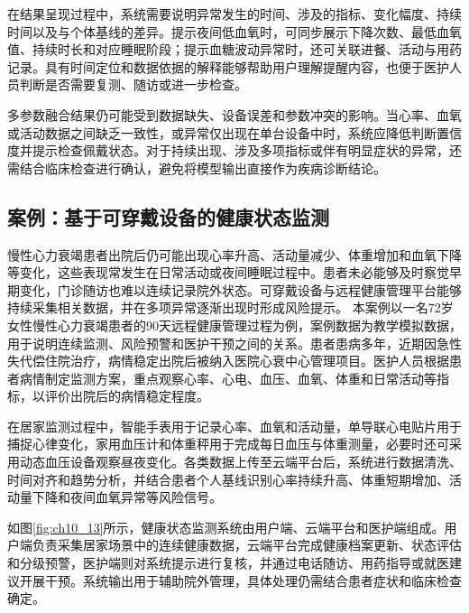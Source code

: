 在结果呈现过程中，系统需要说明异常发生的时间、涉及的指标、变化幅度、持续时间以及与个体基线的差异。提示夜间低血氧时，可同步展示下降次数、最低血氧值、持续时长和对应睡眠阶段；提示血糖波动异常时，还可关联进餐、活动与用药记录。具有时间定位和数据依据的解释能够帮助用户理解提醒内容，也便于医护人员判断是否需要复测、随访或进一步检查。

多参数融合结果仍可能受到数据缺失、设备误差和参数冲突的影响。当心率、血氧或活动数据之间缺乏一致性，或异常仅出现在单台设备中时，系统应降低判断置信度并提示检查佩戴状态。对于持续出现、涉及多项指标或伴有明显症状的异常，还需结合临床检查进行确认，避免将模型输出直接作为疾病诊断结论。

\subsection{案例：基于可穿戴设备的健康状态监测}

慢性心力衰竭患者出院后仍可能出现心率升高、活动量减少、体重增加和血氧下降等变化，这些表现常发生在日常活动或夜间睡眠过程中。患者未必能够及时察觉早期变化，门诊随访也难以连续记录院外状态。可穿戴设备与远程健康管理平台能够持续采集相关数据，并在多项异常逐渐出现时形成风险提示。
本案例以一名72岁女性慢性心力衰竭患者的90天远程健康管理过程为例，案例数据为教学模拟数据，用于说明连续监测、风险预警和医护干预之间的关系。患者患病多年，近期因急性失代偿住院治疗，病情稳定出院后被纳入医院心衰中心管理项目。医护人员根据患者病情制定监测方案，重点观察心率、心电、血压、血氧、体重和日常活动等指标，以评价出院后的病情稳定程度。

在居家监测过程中，智能手表用于记录心率、血氧和活动量，单导联心电贴片用于捕捉心律变化，家用血压计和体重秤用于完成每日血压与体重测量，必要时还可采用动态血压设备观察昼夜变化。各类数据上传至云端平台后，系统进行数据清洗、时间对齐和趋势分析，并结合患者个人基线识别心率持续升高、体重短期增加、活动量下降和夜间血氧异常等风险信号。

如图\ref{fig:ch10_13}所示，健康状态监测系统由用户端、云端平台和医护端组成。用户端负责采集居家场景中的连续健康数据，云端平台完成健康档案更新、状态评估和分级预警，医护端则对系统提示进行复核，并通过电话随访、用药指导或就医建议开展干预。系统输出用于辅助院外管理，具体处理仍需结合患者症状和临床检查确定。

\par
\noindent\begin{minipage}{\textwidth}
\centering
{}
\label{fig:ch10_13}
\end{minipage}
\par

